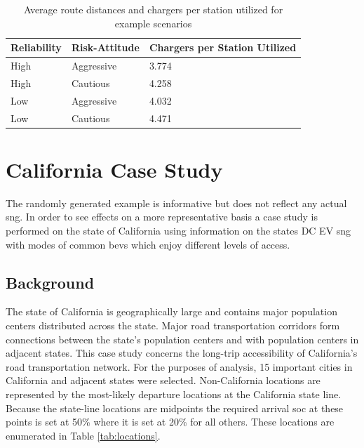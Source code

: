 \documentclass[11pt]{article}
\begin{document}
\begin{multicols}{2}
\begin{table}[H]
	\centering
	\caption{Average route distances and chargers per station utilized for example scenarios}
	\label{tab:distances_redundancy}
	\begin{tabular}{|C{\linewidth / 3}|C{\linewidth / 3}|C{\linewidth / 3}|}
		\hline Reliability & Risk-Attitude & Chargers per Station Utilized \\
		\hline High & Aggressive & 3.774 \\
		\hline High & Cautious & 4.258 \\
		\hline Low & Aggressive & 4.032 \\
		\hline Low & Cautious & 4.471 \\
		\hline
	\end{tabular}
\end{table}

\section*{California Case Study}

The randomly generated example is informative but does not reflect any actual \gls{sng}. In order to see effects on a more representative basis a case study is performed on the state of California using information on the states DC EV \gls{sng} with modes of common \glspl{bev} which enjoy different levels of access.

\subsection*{Background}

The state of California is geographically large and contains major population centers distributed across the state. Major road transportation corridors form connections between the state's population centers and with population centers in adjacent states. This case study concerns the long-trip accessibility of California's road transportation network. For the purposes of analysis, 15 important cities in California and adjacent states were selected. Non-California locations are represented by the most-likely departure locations at the California state line. Because the state-line locations are midpoints the required arrival \gls{soc} at these points is set at 50\% where it is set at 20\% for all others. These locations are enumerated in Table \ref{tab:locations}.


\end{multicols}
\end{document}
